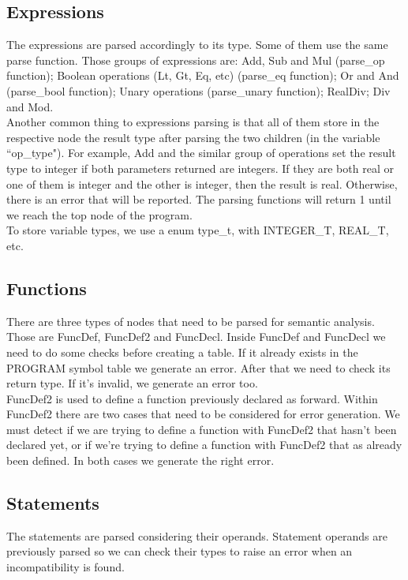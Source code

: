 \documentclass[12pt]{article}
\begin{document}
\subsection{Expressions}

The expressions are parsed accordingly to its type. Some of them use the same parse function. Those groups of expressions are: Add, Sub and Mul (parse\_op function); Boolean operations (Lt, Gt, Eq, etc) (parse\_eq function); Or and And (parse\_bool function); Unary operations (parse\_unary function); RealDiv; Div and Mod.\\
Another common thing to expressions parsing is that all of them store in the respective node the result type after parsing the two children (in the variable ``op\_type"). For example, Add and the similar group of operations set the result type to integer if both parameters returned are integers. If they are both real or one of them is integer and the other is integer, then the result is real. Otherwise, there is an error that will be reported. The parsing functions will return 1 until we reach the top node of the program.\\
To store variable types, we use a enum type\_t, with INTEGER\_T, REAL\_T, etc.\\

\subsection{Functions}
There are three types of nodes that need to be parsed for semantic analysis. Those are FuncDef, FuncDef2 and FuncDecl. Inside FuncDef and FuncDecl we need to do some checks before creating a table. If it already exists in the PROGRAM symbol table we generate an error. After that we need to check its return type. If it's invalid, we generate an error too. \\
FuncDef2 is used to define a function previously declared as forward. Within FuncDef2 there are two cases that need to be considered for error generation. We must detect if we are trying to define a function with FuncDef2 that hasn't been declared yet, or if we're trying to define a function with FuncDef2 that as already been defined. In both cases we generate the right error. \\

\subsection{Statements}
The statements are parsed considering their operands. Statement operands are previously parsed so we can check their types to raise an error when an incompatibility is found.\\
\end{document}
